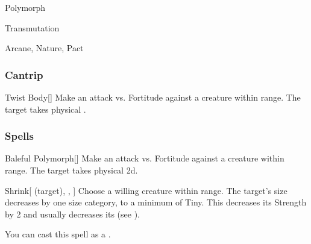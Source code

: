 \newpage
\begin{spellsection}{Polymorph}

\begin{spellheader}
\end{spellheader}


 Transmutation

 Arcane, Nature, Pact

\subsubsection{Cantrip}


\begin{freeability}{Twist Body}[]
Make an attack vs. Fortitude against a creature within \rngmed range.
\hit The target takes physical .
\end{freeability}

\end{spellsection}


\subsubsection{Spells}


\lowercase{\hypertarget{spell:Baleful Polymorph}{}}\label{spell:Baleful Polymorph}
\begin{apability}[\nth{1}]{\hypertarget{spell:Baleful Polymorph}{Baleful Polymorph}}[]
Make an attack vs. Fortitude against a creature within \rngmed range.
\hit The target takes physical  \plus2d.
\end{apability}
\vspace{0.25em}



\lowercase{\hypertarget{spell:Shrink}{}}\label{spell:Shrink}
\begin{attuneability}[\nth{1}]{\hypertarget{spell:Shrink}{Shrink}}[ (target), , ]
Choose a willing creature within \rngclose range.
The target's size decreases by one size category, to a minimum of Tiny.
This decreases its Strength by 2 and usually decreases its  (see ).

You can cast this spell as a .
\end{attuneability}
\vspace{0.25em}



